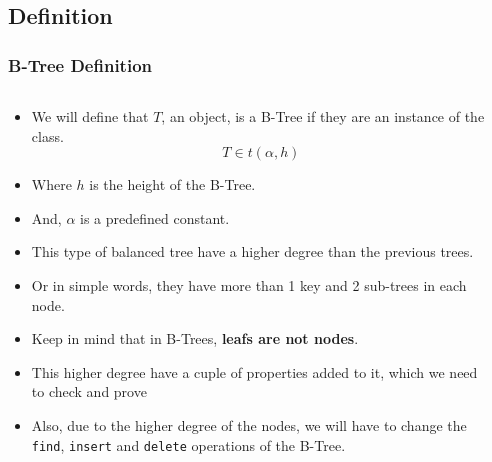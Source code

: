 \begin{frame}
    \subsection{Definition}
    \frametitle{B-Tree Definition}
    \begin{columns}
        \begin{column}{\textlecolumn}
            \begin{block}{}
                \begin{itemize}
                    \item We will define that \(T\), an object, is a B-Tree if they are an instance of the class.
                    \[
                        T \in t\left(\alpha, h\right)
                    \]
                    \item Where \(h\) is the height of the B-Tree.
                    \item And, \(\alpha\) is a predefined constant.
                    \item This type of balanced tree have a higher degree than the previous trees.
                    \item Or in simple words, they have more than 1 key and 2 sub-trees in each node.
                    \item Keep in mind that in B-Trees, \textbf{leafs are not nodes}.
                    \item This higher degree have a cuple of properties added to it, which we need to check and prove
                    \item Also, due to the higher degree of the nodes, we will have to change the 
                        \lstinline|find|, \lstinline|insert| and \lstinline|delete| operations of the B-Tree.
                \end{itemize}
            \end{block}
        \end{column}
        \begin{column}{\textricolumn}
        \end{column}
    \end{columns}
    

\end{frame}
